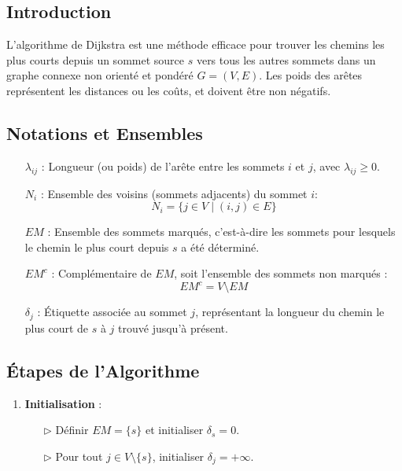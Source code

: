 \documentclass{report}
\begin{document}
\begin{multicols*}{2}
\subsection*{Introduction}

L'algorithme de Dijkstra est une méthode efficace pour trouver les chemins les plus courts depuis un sommet source \( s \) vers tous les autres sommets dans un graphe connexe non orienté et pondéré \( G = (V, E) \). Les poids des arêtes représentent les distances ou les coûts, et doivent être non négatifs.

\subsection*{Notations et Ensembles}

\begin{itemize}
    \item[\( \lambda_{ij} \)] : Longueur (ou poids) de l'arête entre les sommets \( i \) et \( j \), avec \( \lambda_{ij} \geq 0 \).
    \item[\( N_i \)] : Ensemble des voisins (sommets adjacents) du sommet \( i \):
    \[
    N_i = \{ j \in V \mid (i, j) \in E \}
    \]
    \item[\( EM \)] : Ensemble des sommets marqués, c'est-à-dire les sommets pour lesquels le chemin le plus court depuis \( s \) a été déterminé.
    \item[\( EM^c \)] : Complémentaire de \( EM \), soit l'ensemble des sommets non marqués :
    \[
    EM^c = V \setminus EM
    \]
    \item[\( \delta_j \)] : Étiquette associée au sommet \( j \), représentant la longueur du chemin le plus court de \( s \) à \( j \) trouvé jusqu'à présent.
\end{itemize}

\subsection*{Étapes de l'Algorithme}

\begin{enumerate}
    \item \textbf{Initialisation} :
    \begin{itemize}
        \item[\( \rhd \)] Définir \( EM = \{ s \} \) et initialiser \( \delta_s = 0 \).
        \item[\( \rhd \)] Pour tout \( j \in V \setminus \{ s \} \), initialiser \( \delta_j = +\infty \).
    \end{itemize}


\end{enumerate}
\end{multicols*}
\end{document}
